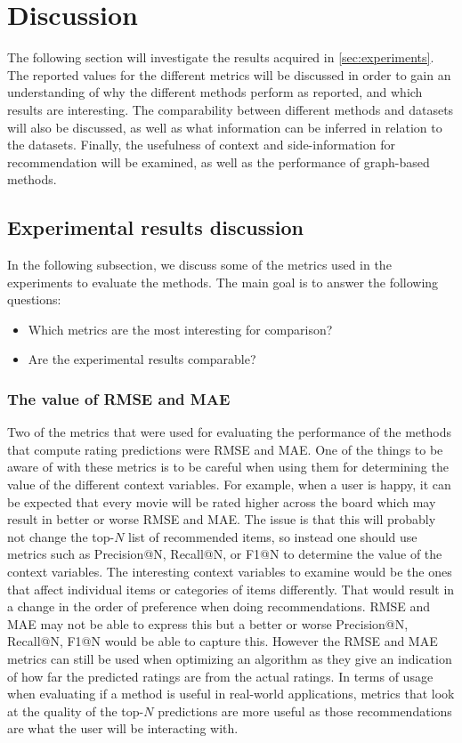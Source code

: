 \section{Discussion}\label{sec:discussion}
The following section will investigate the results acquired in \autoref{sec:experiments}.
The reported values for the different metrics will be discussed in order to gain an understanding of why the different methods perform as reported, and which results are interesting.
The comparability between different methods and datasets will also be discussed, as well as what information can be inferred in relation to the datasets.
Finally, the usefulness of context and side-information for recommendation will be examined, as well as the performance of graph-based methods.

\subsection{Experimental results discussion}
In the following subsection, we discuss some of the metrics used in the experiments to evaluate the methods.
The main goal is to answer the following questions:
\begin{itemize}
    \item Which metrics are the most interesting for comparison?
    \item Are the experimental results comparable?
\end{itemize}

\subsubsection{The value of RMSE and MAE}
Two of the metrics that were used for evaluating the performance of the methods that compute rating predictions were RMSE and MAE.
One of the things to be aware of with these metrics is to be careful when using them for determining the value of the different context variables.
For example, when a user is happy, it can be expected that every movie will be rated higher across the board which may result in better or worse RMSE and MAE.
The issue is that this will probably not change the top-$N$ list of recommended items, so instead one should use metrics such as Precision@N, Recall@N, or F1@N to determine the value of the context variables.
The interesting context variables to examine would be the ones that affect individual items or categories of items differently.
That would result in a change in the order of preference when doing recommendations.
RMSE and MAE may not be able to express this but a better or worse Precision@N, Recall@N, F1@N would be able to capture this.
However the RMSE and MAE metrics can still be used when optimizing an algorithm as they give an indication of how far the predicted ratings are from the actual ratings.
In terms of usage when evaluating if a method is useful in real-world applications, metrics that look at the quality of the top-$N$ predictions are more useful as those recommendations are what the user will be interacting with.

